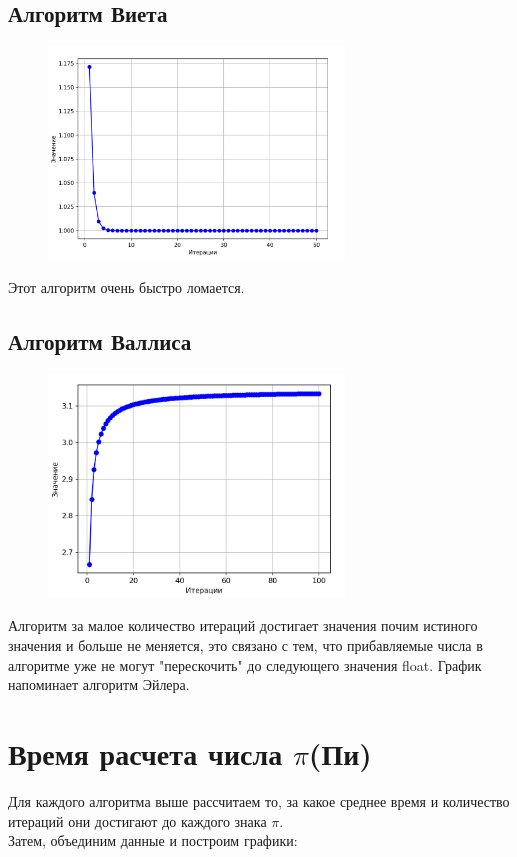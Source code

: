\documentclass[a4paper,12pt]{article} %
\begin{document}
\subsection{Алгоритм Виета}
\begin{figure}[H]
    \centering
    \includegraphics[width=0.7\textwidth]{8.jpg}
\end{figure} 
Этот алгоритм очень быстро ломается.

\subsection{Алгоритм Валлиса}
\begin{figure}[H]
    \centering
    \includegraphics[width=0.7\textwidth]{9.jpg}
\end{figure} 

Алгоритм за малое количество итераций достигает значения почим истиного значения
и больше не меняется, это связано с тем, что прибавляемые числа в алгоритме уже не могут "перескочить" до следующего значения float. График напоминает алгоритм Эйлера.

\section{Время расчета числа $\pi$(Пи)}
Для каждого алгоритма выше рассчитаем то, за какое среднее время и количество итераций они достигают до каждого знака $\pi$.\\
Затем, объединим данные и построим графики:
\end{document}
